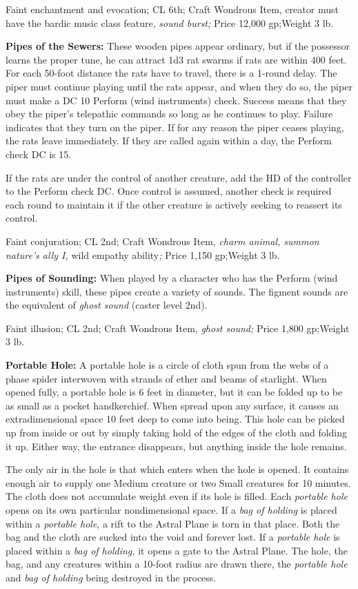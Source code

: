 \documentclass{article}
\begin{document}
Faint enchantment and evocation; CL 6th; Craft Wondrous Item, creator must have 
the bardic music class feature, \textit{sound burst; }Price 12,000 gp;Weight 3 
lb.

\textbf{Pipes of the Sewers:} These wooden pipes appear ordinary, but if the possessor 
learns the proper tune, he can attract 1d3 rat swarms if rats are within 400 feet. 
For each 50-foot distance the rats have to travel, there is a 1-round delay. The 
piper must continue playing until the rats appear, and when they do so, the piper 
must make a DC 10 Perform (wind instruments) check. Success means that they obey 
the piper's telepathic commands so long as he continues to play. Failure indicates 
that they turn on the piper. If for any reason the piper ceases playing, the rats 
leave immediately. If they are called again within a day, the Perform check DC 
is 15.

If the rats are under the control of another creature, add the HD of the controller 
to the Perform check DC. Once control is assumed, another check is required each 
round to maintain it if the other creature is actively seeking to reassert its 
control.

Faint conjuration; CL 2nd; Craft Wondrous Item, \textit{charm animal, summon nature's 
ally I, }wild empathy ability\textit{; }Price 1,150 gp;Weight 3 lb.

\textbf{Pipes of Sounding:} When played by a character who has the Perform (wind 
instruments) skill, these pipes create a variety of sounds. The figment sounds 
are the equivalent of \textit{ghost sound }(caster level 2nd).

Faint illusion; CL 2nd; Craft Wondrous Item, \textit{ghost sound; }Price 1,800 
gp;Weight 3 lb.

\textbf{Portable Hole:} A portable hole is a circle of cloth spun from the webs 
of a phase spider interwoven with strands of ether and beams of starlight. When 
opened fully, a portable hole is 6 feet in diameter, but it can be folded up to 
be as small as a pocket handkerchief. When spread upon any surface, it causes an 
extradimensional space 10 feet deep to come into being. This hole can be picked 
up from inside or out by simply taking hold of the edges of the cloth and folding 
it up. Either way, the entrance disappears, but anything inside the hole remains.

The only air in the hole is that which enters when the hole is opened. It contains 
enough air to supply one Medium creature or two Small creatures for 10 minutes. 
The cloth does not accumulate weight even if its hole is filled. Each \textit{portable 
hole }opens on its own particular nondimensional space. If a \textit{bag of holding 
}is placed within a \textit{portable hole}, a rift to the Astral Plane is torn 
in that place. Both the bag and the cloth are sucked into the void and forever 
lost. If a \textit{portable hole }is placed within a \textit{bag of holding, }it 
opens a gate to the Astral Plane. The hole, the bag, and any creatures within a 
10-foot radius are drawn there, the \textit{portable hole }and \textit{bag of holding 
}being destroyed in the process.
\end{document}
